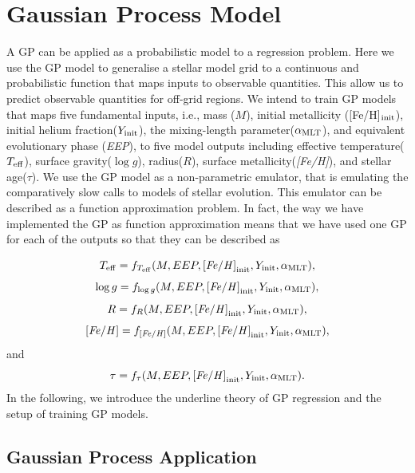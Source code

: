 \section{Gaussian Process Model}\label{sec:gpmodel}
A GP can be applied as a probabilistic model to a regression problem.  Here we use the GP model to generalise a stellar model grid to a continuous and probabilistic function that maps inputs to observable quantities.  This allow us to predict observable quantities for off-grid regions.
%
We intend to train GP models that maps five fundamental inputs,  i.e., mass ($M$), initial metallicity ([Fe/H]$_{\rm init}$), initial helium fraction($Y_{\rm init}$), the mixing-length parameter($\alpha_{\rm MLT}$), and equivalent evolutionary phase ({\it EEP}), to five model outputs including effective temperature($T_{\rm eff}$), surface gravity($\log g$), radius($R$), surface metallicity({\it [Fe/H]}), and stellar age($\tau$). We use the GP model as a non-parametric emulator, that is emulating the comparatively slow calls to models of stellar evolution.
This emulator can be described as a function approximation problem. In fact, the way we have implemented the GP as function approximation means that we have used one GP for each of the outputs so that they can be described as

\begin{equation}\label{gprmodel1}
{T_{\rm eff}} = f_{T_{\rm eff}}(M, EEP, {\it [Fe/H]}_{\rm init}, Y_{\rm init}, \alpha_{\rm MLT}),
\end{equation}
\begin{equation}\label{gprmodel1}
{\log g} = f_{\log g}(M, EEP, {\it [Fe/H]}_{\rm init}, Y_{\rm init}, \alpha_{\rm MLT}),
\end{equation}
\begin{equation}\label{gprmodel1}
{R} = f_{R}(M, EEP, {\it [Fe/H]}_{\rm init}, Y_{\rm init}, \alpha_{\rm MLT}),
\end{equation}
\begin{equation}\label{gprmodel1}
{\it [Fe/H]} = f_{\it [Fe/H]}(M, EEP, {\it [Fe/H]}_{\rm init}, Y_{\rm init}, \alpha_{\rm MLT}),
\end{equation}
and 
\begin{equation}\label{gprmodel1}
{\tau} = f_{\tau}(M, EEP, {\it [Fe/H]}_{\rm init}, Y_{\rm init}, \alpha_{\rm MLT}).
\end{equation}
In the following, we introduce the underline theory of GP regression and the setup of training GP models.  


\subsection{Gaussian Process Application}

